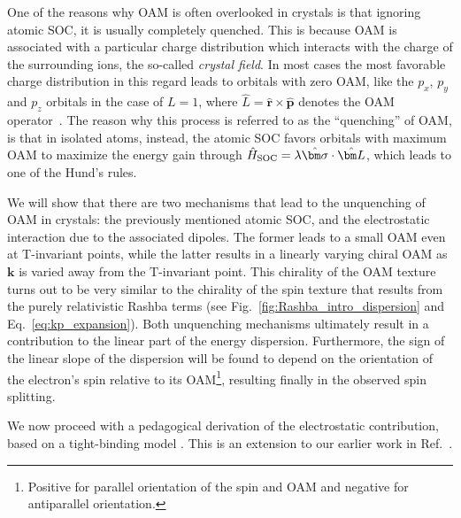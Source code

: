 One of the reasons why OAM is often overlooked in crystals is that ignoring atomic SOC, it is usually completely quenched.
This is because OAM is associated with a particular charge distribution which interacts with the charge of the surrounding ions, the so-called {\it crystal field}.
In most cases the most favorable charge distribution in this regard leads to orbitals with zero OAM, like the $p_x$, $p_y$ and $p_z$ orbitals in the case of $L=1$, where $\hat{L} = \hat{\bm r} \times \hat{\bm p}$ denotes the OAM operator~\cite{Ballhausen}.
The reason why this process is referred to as the ``quenching'' of OAM, is that in isolated atoms, instead, the atomic SOC favors orbitals with maximum OAM to maximize the energy gain through $\hat{H}_{\rm SOC} = \lambda \hat{\bm \sigma} \cdot \hat{\bm L}$, which leads to one of the Hund's rules.
    
We will show that there are two mechanisms that lead to the unquenching of OAM in crystals: the previously mentioned atomic SOC, and the electrostatic interaction due to the associated dipoles.
The former leads to a small OAM even at T-invariant points, while the latter results in a linearly varying chiral OAM as $\bm k$ is varied away from the T-invariant point.
This chirality of the OAM texture turns out to be very similar to the chirality of the spin texture that results from the purely relativistic Rashba terms (see Fig.~\ref{fig:Rashba_intro_dispersion} and Eq.~\eqref{eq:kp_expansion}).
Both unquenching mechanisms ultimately result in a contribution to the linear part of the energy dispersion.
Furthermore, the sign of the linear slope of the dispersion will be found to depend on the orientation of the electron's spin relative to its OAM\footnote{Positive for parallel orientation of the spin and OAM and negative for antiparallel orientation.}, resulting finally in the observed spin splitting.
    
We now proceed with a pedagogical derivation of the electrostatic contribution, based on a tight-binding model \cite{Bloch1929,Slater1954,Petersen2000,Kim2014,Go2016}. This is an extension to our earlier work in Ref.~\cite{Ponet2018}.

